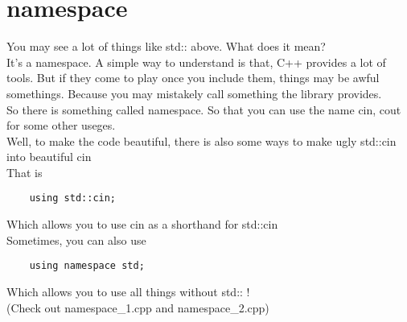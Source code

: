 \documentclass{article}
\begin{document}
\section{namespace}
You may see a lot of things like std:: above. What does it mean?\\
It's a namespace. A simple way to understand is that, C++ provides a lot of tools. But if they come to play once you include them, things may be awful somethings. Because you may mistakely call something the library provides.\\
So there is something called namespace. So that you can use the name cin, cout for some other useges.\\
Well, to make the code beautiful, there is also some ways to make ugly std::cin into beautiful cin\\
That is
\begin{lstlisting}
    using std::cin;
\end{lstlisting}
Which allows you to use cin as a shorthand for std::cin\\
Sometimes, you can also use
\begin{lstlisting}
    using namespace std;
\end{lstlisting}
Which allows you to use all things without std:: !\\
(Check out namespace\_1.cpp and namespace\_2.cpp)
\newpage
\end{document}
